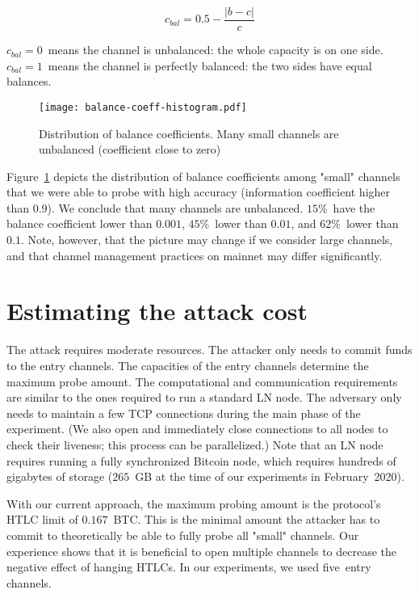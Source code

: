 \[c_{bal} = 0.5 - \frac{|b-c|}{c} \]

$c_{bal} = 0$~means the channel is unbalanced: the whole capacity is on one side.
$c_{bal} = 1$~means the channel is perfectly balanced: the two sides have equal balances.

\begin{figure}[h]
	\centering
	\texttt{[image: balance-coeff-histogram.pdf]}
	\caption{Distribution of balance coefficients. Many small channels are unbalanced (coefficient close to zero)}
	\label{fig:balance-coeff-histogram}
\end{figure}

Figure~\ref{fig:balance-coeff-histogram} depicts the distribution of balance coefficients among "small" channels that we were able to probe with high accuracy (information coefficient higher than $0.9$).
We conclude that many channels are unbalanced.
$15$\%~have the balance coefficient lower than $0.001$, $45\%$~lower than $0.01$, and $62\%$~lower than $0.1$.
Note, however, that the picture may change if we consider large channels, and that channel management practices on mainnet may differ significantly.


\section{Estimating the attack cost}

The attack requires moderate resources.
The attacker only needs to commit funds to the entry channels.
The capacities of the entry channels determine the maximum probe amount.
The computational and communication requirements are similar to the ones required to run a standard LN node.
The adversary only needs to maintain a few TCP connections during the main phase of the experiment.
(We also open and immediately close connections to all nodes to check their liveness; this process can be parallelized.)
Note that an LN node requires running a fully synchronized Bitcoin node, which requires hundreds of gigabytes of storage ($265$~GB at the time of our experiments in February~2020).

With our current approach, the maximum probing amount is the protocol's HTLC limit of $0.167$~BTC\@.
This is the minimal amount the attacker has to commit to theoretically be able to fully probe all "small" channels.
Our experience shows that it is beneficial to open multiple channels to decrease the negative effect of hanging HTLCs.
In our experiments, we used five~entry channels.

